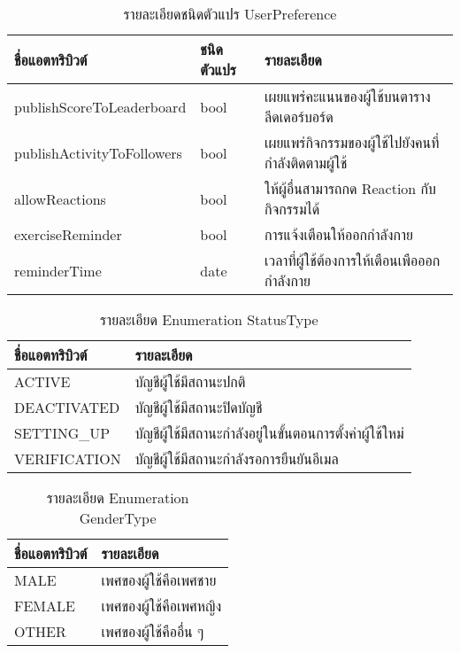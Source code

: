 \begin{table}
    \caption{รายละเอียดชนิดตัวแปร UserPreference}
    \begin{tabularx}{\textwidth}{ | l | l | X | }
        \hline
        \bf ชื่อแอตทริบิวต์ & \bf ชนิดตัวแปร & \bf รายละเอียด \\\hline
        publishScoreToLeaderboard & bool & เผยแพร่คะแนนของผู้ใช้บนตารางลีดเดอร์บอร์ด\\\hline
        publishActivityToFollowers & bool & เผยแพร่กิจกรรมของผู้ใช้ไปยังคนที่กำลังติดตามผู้ใช้\\\hline
        allowReactions & bool & ให้ผู้อื่นสามารถกด Reaction กับกิจกรรมได้\\\hline
        exerciseReminder & bool & การแจ้งเตือนให้ออกกำลังกาย\\\hline
        reminderTime & date & เวลาที่ผู้ใช้ต้องการให้เตือนเพือออกกำลังกาย\\\hline
    \end{tabularx}
\end{table}

\begin{table}
    \caption{รายละเอียด Enumeration StatusType}
    \begin{tabularx}{\textwidth}{ | l | X | }
        \hline
        \bf ชื่อแอตทริบิวต์ & \bf รายละเอียด \\\hline
        ACTIVE & บัญชีผู้ใช้มีสถานะปกติ\\\hline
        DEACTIVATED & บัญชีผู้ใช้มีสถานะปิดบัญชี\\\hline
        SETTING\_UP & บัญชีผู้ใช้มีสถานะกำลังอยู่ในขั้นตอนการตั้งค่าผู้ใช้ใหม่\\\hline
        VERIFICATION & บัญชีผู้ใช้มีสถานะกำลังรอการยืนยันอีเมล\\\hline
    \end{tabularx}
\end{table}

\begin{table}
    \caption{รายละเอียด Enumeration GenderType}
    \begin{tabularx}{\textwidth}{ | l | X | }
        \hline
        \bf ชื่อแอตทริบิวต์ & \bf รายละเอียด \\\hline
        MALE & เพศของผู้ใช้คือเพศชาย\\\hline
        FEMALE & เพศของผู้ใช้คือเพศหญิง\\\hline
        OTHER & เพศของผู้ใช้คืออื่น ๆ\\\hline
    \end{tabularx}
\end{table}

